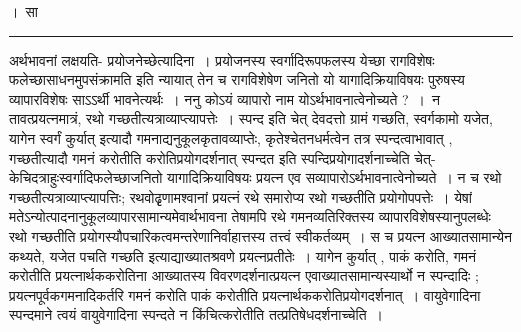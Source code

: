 \documentclass[11pt, openany]{book}
\begin{document}
{।~सा}\\
\hrule
\vspace{3mm}

 अर्थभावनां लक्षयति- {\br प्रयोजनेच्छेत्यादिना~।} प्रयोजनस्य स्वर्गादिरूपफलस्य येच्छा रागविशेषः {\qt फलेच्छासाधनमुपसंक्रामति} इति न्यायात् तेन च रागविशेषेण जनितो यो यागादिक्रियाविषयः पुरुषस्य व्यापारविशेषः साऽऽर्थी भावनेत्यर्थः~। {\br ननु} कोऽयं व्यापारो नाम योऽर्थभावनात्वेनोच्यते ?~।~न तावत्प्रयत्नमात्रं, रथो
गच्छतीत्यत्राव्याप्त्यापत्तेः~। स्पन्द इति चेत् {\qt देवदत्तो ग्रामं गच्छति, स्वर्गकामो यजेत, यागेन स्वर्गं कुर्यात्} इत्यादौ गमनाद्यनुकूलकृतावव्याप्तेः, कृतेश्चेतनधर्मत्वेन तत्र स्पन्दत्वाभावात् , गच्छतीत्यादौ गमनं करोतीति करोतिप्रयोगदर्शनात् स्पन्दत इति स्पन्दिप्रयोगादर्शनाच्चेति चेत्- केचिदत्राहुः\textendash स्वर्गादिफलेच्छाजनितो
यागादिक्रियाविषयः प्रयत्न एव सव्यापारोऽर्थभावनात्वेनोच्यते~। न च रथो गच्छतीत्यत्राव्याप्त्यापत्तिः; रथवोढृृणामश्वानां प्रयत्नं रथे समारोप्य रथो गच्छतीति प्रयोगोपपत्तेः~। येषां मतेऽन्योत्पादनानुकूलव्यापारसामान्यमेवार्थभावना तेषामपि रथे गमनव्यतिरिक्तस्य व्यापारविशेषस्यानुपलब्धेः रथो गच्छतीति प्रयोगस्यौपचारिकत्वमन्तरेणानिर्वाहात्तस्य तत्त्वं स्वीकर्तव्यम्~। स च प्रयत्न आख्यातसामान्येन कथ्यते, {\qt यजेत पचति गच्छति} इत्याद्याख्यातश्रवणे प्रयत्नप्रतीतेः~। यागेन कुर्यात् , पाकं करोति, गमनं करोतीति
प्रयत्नार्थककरोतिना आख्यातस्य विवरणदर्शनात्प्रयत्न एवाख्यातसामान्यस्यार्थो न स्पन्दादिः ; प्रयत्नपूर्वकगमनादिकर्तरि गमनं करोति पाकं करोतीति प्रयत्नार्थककरोतिप्रयोगदर्शनात्~। वायुवेगादिना स्पन्दमाने त्वयं वायुवेगादिना स्पन्दते न किंचित्करोतीति तत्प्रतिषेधदर्शनाच्चेति~।\\
\end{document}
